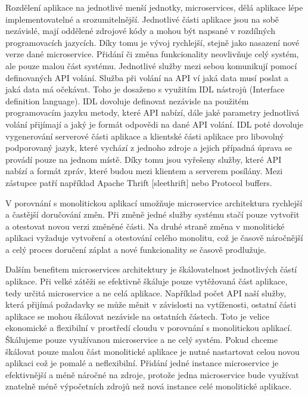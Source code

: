     Rozdělení aplikace na jednotlivé menší jednotky, microservices, dělá aplikace lépe implementovatelné a srozumitelnější. Jednotlivé části aplikace jsou na sobě nezávislé, mají oddělené zdrojové kódy a mohou být napsané v rozdílných programovacích jazycích. Díky tomu je vývoj rychlejší, stejně jako nasazení nové verze dané microservice. Přidání či změna funkcionality neovlivňuje celý systém, ale pouze malou část systému. Jednotlivé služby mezi sebou komunikují pomocí definovaných API volání. Služba při volání na API ví jaká data musí poslat a jaká data má očekávat. Toho je dosaženo s využitím IDL nástrojů (Interface definition language). IDL dovoluje definovat nezávisle na použitém programovacím jazyku metody, které API nabízí, dále jaké parametry jednotlivá volání přijímají a jaký je formát odpovědi na dané API volání. IDL poté dovoluje vygenerování serverové části aplikace a klientské části aplikace pro libovolný podporovaný jazyk, které vychází z jednoho zdroje a jejich případná úprava se provádí pouze na jednom místě. Díky tomu jsou vyřešeny služby, které API nabízí a formát zpráv, které budou mezi klientem a serverem posílány. Mezi zástupce patří například Apache Thrift [sleethrift] nebo Protocol buffers. \par
    V porovnání s monolitickou aplikací umožňuje microservice architektura rychlejší a častější doručování změn. Při změně jedné služby systému stačí pouze vytvořit a otestovat novou verzi změněné části. Na druhé straně změna v monolitické aplikaci vyžaduje vytvoření a otestování celého monolitu, což je časově náročnější a celý proces doručení záplat a nové funkcionality se časově prodlužuje. \par
    Dalším benefitem microservices architektury je škálovatelnost jednotlivých částí aplikace. Při velké zátěži se efektivně škáluje pouze vytěžovaná část aplikace, tedy určitá microservice a ne celá aplikace. Například počet API naší služby, která přijímá požadavky se může měnit v závislosti na vytíženosti, ostatní části aplikace se mohou škálovat nezávisle na ostatních částech. Toto je velice ekonomické a flexibilní v prostředí cloudu v porovnání s monolitickou aplikací. Škálujeme pouze využívanou microservice a ne celý systém. Pokud chceme škálovat pouze malou část monolitické aplikace je nutné nastartovat celou novou aplikaci což je pomalé a neflexibilní. Přidání jedné instance microservice je efektivnější a méně náročné na zdroje, protože jedna microservice bude využívat znatelně méně výpočetních zdrojů než nová instance celé monolitické aplikace. \par

